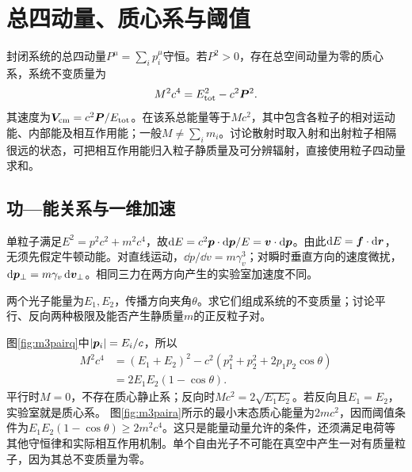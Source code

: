 \section{总四动量、质心系与阈值}\label{th:m3momentum}
封闭系统的总四动量$P^\mu=\sum_i p_i^\mu$守恒。若$P^2>0$，存在总空间动量为零的质心系，系统不变质量为
\[
 M^2c^4=E_{\rm tot}^2-c^2\bm{P}^2.
\]
其速度为$\bm{V}_{\rm cm}=c^2\bm{P}/E_{\rm tot}$。在该系总能量等于$Mc^2$，其中包含各粒子的相对运动能、内部能及相互作用能；一般$M\ne\sum_i m_i$。讨论散射时取入射和出射粒子相隔很远的状态，可把相互作用能归入粒子静质量及可分辨辐射，直接使用粒子四动量求和。

\subsection{功—能关系与一维加速}
单粒子满足$E^2=p^2c^2+m^2c^4$，故$\mathop{}\!\mathrm d E=c^2\bm{p}\cdot\mathop{}\!\mathrm d\bm{p}/E=\bm{v}\cdot\mathop{}\!\mathrm d\bm{p}$。由此$\mathop{}\!\mathrm d E=\bm{f}\cdot\mathop{}\!\mathrm d\bm{r}$，无须先假定牛顿动能。对直线运动，$\dd p/\dd v=m\gamma_v^3$；对瞬时垂直方向的速度微扰，$\mathop{}\!\mathrm d\bm{p}_\perp=m\gamma_v\mathop{}\!\mathrm d\bm{v}_\perp$。相同三力在两方向产生的实验室加速度不同。

\begin{example}\label{ex:m3photonpair}
两个光子能量为$E_1,E_2$，传播方向夹角$\theta$。求它们组成系统的不变质量；讨论平行、反向两种极限及能否产生静质量$m$的正反粒子对。
\end{example}
\begin{solution}
图\ref{fig:m3pairq}中$|\bm{p}_i|=E_i/c$，所以
\begin{align*}
 M^2c^4&=(E_1+E_2)^2-c^2(p_1^2+p_2^2+2p_1p_2\cos\theta)\\
 &=2E_1E_2(1-\cos\theta).
\end{align*}
平行时$M=0$，不存在质心静止系；反向时$Mc^2=2\sqrt{E_1E_2}$。若反向且$E_1=E_2$，实验室就是质心系。
图\ref{fig:m3paira}所示的最小末态质心能量为$2mc^2$，因而阈值条件为$E_1E_2(1-\cos\theta)\geq2m^2c^4$。这只是能量动量允许的条件，还须满足电荷等其他守恒律和实际相互作用机制。单个自由光子不可能在真空中产生一对有质量粒子，因为其总不变质量为零。
\end{solution}

